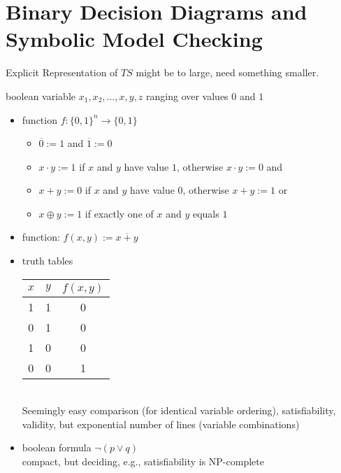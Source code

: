 \documentclass[a4paper, 10pt]{article}
\begin{document}
\section{Binary Decision Diagrams and Symbolic Model Checking}
Explicit Representation of $TS$ might be to large, need something smaller.
\begin{mdframed}[roundcorner=5pt,
subtitlebelowline=false,subtitleaboveline=false,
subtitlebackgroundcolor=blue!30,
frametitlerule=true,
frametitlebackgroundcolor=blue!30,
frametitle={Boolean Functions}
]
boolean variable $x_1,x_2,\dots,x,y,z$ ranging over values $0$ and $1$
\begin{itemize}
    \item function $f:\{0,1\}^n\to\{0,1\}$
    \begin{itemize}
        \item $\overline{0}:=1$ and $\overline{1}:=0$
        \item $x\cdot y:=1$ if $x$ and $y$ have value $1$, otherwise $x\cdot y:=0$ {\tiny and}
        \item $x+y:=0$ if $x$ and $y$ have value $0$, otherwise $x+y:=1$ {\tiny or}
        \item $x\oplus y:=1$ if exactly one of $x$ and $y$ equals $1$
    \end{itemize}
\end{itemize}
\begin{itemize}
    \item function: $f(x,y):=\overline{x+y}$
    \item truth tables
    \begin{tabular}{cc|c}
    $x$ & $y$ & $f(x,y)$ \\
    \hline
    1 & 1 & 0 \\
    0 & 1 & 0 \\
    1 & 0 & 0 \\
    0 & 0 & 1
    \end{tabular}\\
    Seemingly easy comparison (for identical variable ordering), satisfiability, validity, but exponential number of lines (variable combinations)
    \item boolean formula $\neg(p\vee q)$
    \\ compact, but deciding, e.g., satisfiability is NP-complete
\end{itemize}
\end{mdframed}
\end{document}
